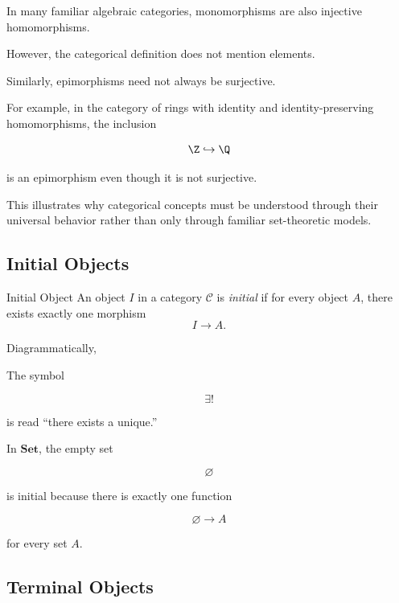 In many familiar algebraic categories, monomorphisms are also injective
homomorphisms.

However, the categorical definition does not mention elements.

Similarly, epimorphisms need not always be surjective.

For example, in the category of rings with identity and identity-preserving
homomorphisms, the inclusion

\[ \Z\hookrightarrow\Q \]

is an epimorphism even though it is not surjective.

This illustrates why categorical concepts must be understood through their
universal behavior rather than only through familiar set-theoretic models.

\subsection{Initial Objects}
\label{subsec:initial-objects}

\begin{definitionbox}{Initial Object}
An object \(I\) in a category \(\mathcal C\) is \emph{initial} if for every
object \(A\), there exists exactly one morphism
\[ I\to A. \]
\end{definitionbox}

Diagrammatically,

\begin{center}
\end{center}

The symbol

\[ \exists! \]

is read ``there exists a unique.''

In \(\mathbf{Set}\), the empty set

\[ \varnothing \]

is initial because there is exactly one function

\[ \varnothing\to A \]

for every set \(A\).

\subsection{Terminal Objects}
\label{subsec:terminal-objects}

